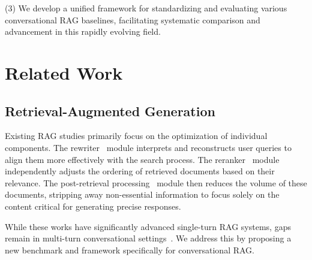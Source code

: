\documentclass[11pt]{article}
\begin{document}
(3) We develop a unified framework for standardizing and evaluating various conversational RAG baselines, facilitating systematic comparison and advancement in this rapidly evolving field.













\section{Related Work}

\subsection{Retrieval-Augmented Generation}
Existing RAG studies primarily focus on the optimization of individual components.
The rewriter~\cite{li_sigir24,wang_emnlp23_query2doc,baek_arxiv} module interprets and reconstructs user queries to align them more effectively with the search process. The reranker~\cite{ma_acl23,dong_dparag,xu_www24_genpt} module independently adjusts the ordering of retrieved documents based on their relevance. The post-retrieval processing~\cite{xu_recomp,yang_emnlp23_prca,wang_filco,jiang_acl24_longllmlingua,jin_acl24_bider} module then reduces the volume of these documents, stripping away non-essential information to focus solely on the content critical for generating precise responses.

While these works have significantly advanced single-turn RAG systems, gaps remain in multi-turn conversational settings~\cite{ye_sigir24_convrag}. We address this by proposing a new benchmark and framework specifically for conversational RAG.
\end{document}
